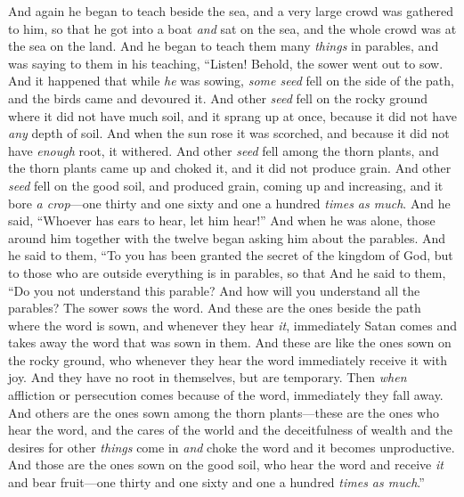 \begin{biblechapter} %
 And again he began to teach beside the sea, and a very large crowd was gathered to him, so that he got into a boat \textit{and} sat on the sea, and the whole crowd was at the sea on the land.
\verse And he began to teach them many \textit{things} in parables, and was saying to them in his teaching,
\verse “Listen! Behold, the sower went out to sow.
\verse And it happened that while \textit{he} was sowing, \textit{some seed} fell on the side of the path, and the birds came and devoured it.
\verse And other \textit{seed} fell on the rocky ground where it did not have much soil, and it sprang up at once, because it did not have \textit{any} depth of soil.
\verse And when the sun rose it was scorched, and because it did not have \textit{enough} root, it withered.
\verse And other \textit{seed} fell among the thorn plants, and the thorn plants came up and choked it, and it did not produce grain.
\verse And other \textit{seed} fell on the good soil, and produced grain, coming up and increasing, and it bore \textit{a crop}—one thirty and one sixty and one a hundred \textit{times as much}.
\verse And he said, “Whoever has ears to hear, let him hear!”
 And when he was alone, those around him together with the twelve began asking him about the parables.
\verse And he said to them, “To you has been granted the secret of the kingdom of God, but to those who are outside everything is in parables,
\verse so that
 And he said to them, “Do you not understand this parable? And how will you understand all the parables?
\verse The sower sows the word.
\verse And these are the ones beside the path where the word is sown, and whenever they hear \textit{it}, immediately Satan comes and takes away the word that was sown in them.
\verse And these are like the ones sown on the rocky ground, who whenever they hear the word immediately receive it with joy.
\verse And they have no root in themselves, but are temporary. Then \textit{when} affliction or persecution comes because of the word, immediately they fall away.
\verse And others are the ones sown among the thorn plants—these are the ones who hear the word,
\verse and the cares of the world and the deceitfulness of wealth and the desires for other \textit{things} come in \textit{and} choke the word and it becomes unproductive.
\verse And those are the ones sown on the good soil, who hear the word and receive \textit{it} and bear fruit—one thirty and one sixty and one a hundred \textit{times as much}.”

\end{biblechapter}
